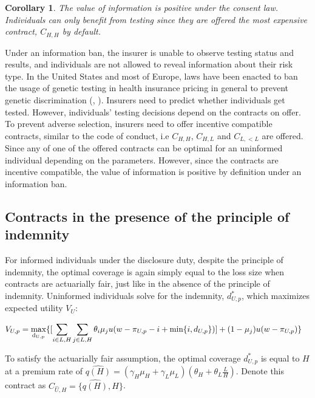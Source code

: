 \documentclass[nonatbib,preprint,12pt]{elsarticle}
\theoremstyle{plain}
\newtheorem{corollary}[theorem]{Corollary}
\theoremstyle{definition}
\theoremstyle{plain}
\theoremstyle{TheoremNum}
\theoremstyle{CorollaryNum}
\theoremstyle{PropositionNum}
\theoremstyle{TheoremNum}
\begin{document}
\setcounter{theorem}{2}
\renewcommand{\thetheorem}{\arabic{theorem}}
\begin{corollary}
    The value of information is positive under the consent law. Individuals can only benefit from testing since they are offered the most expensive contract, $C_{H,H}$ by default.
\end{corollary}

Under an information ban, the insurer is unable to observe testing status and results, and individuals are not allowed to reveal information about their risk type. In the United States and most of Europe, laws have been enacted to ban the usage of genetic testing in health insurance pricing in general to prevent genetic discrimination (\citeauthor{nill2019use}, \citeyear{nill2019use}). Insurers need to predict whether individuals get tested. However, individuals' testing decisions depend on the contracts on offer. To prevent adverse selection, insurers need to offer incentive compatible contracts, similar to the code of conduct, i.e $C_{H,H}$, $C_{H,L}$ and $C_{L,<L}$ are offered. Since any of one of the offered contracts can be optimal for an uninformed individual depending on the parameters. However, since the contracts are incentive compatible, the value of information is positive by definition under an information ban.

\subsection{Contracts in the presence of the principle of indemnity}

For informed individuals under the disclosure duty, despite the principle of indemnity, the optimal coverage is again simply equal to the loss size when contracts are actuarially fair, just like in the absence of the principle of indemnity. Uninformed individuals solve for the indemnity, $d_{U,p}^*$, which maximizes expected utility $V_{U}$:

\begin{align}
V_{U,p} = \underset{\rm d_{U,p}}{\rm max } & \{[\sum_{i \in {L,H}} \sum_{j \in {L,H}} \theta_i \mu_j u(w-\pi_{U,p}-i+\text{min}\{i,d_{U,p}\})] + (1-\mu_j)u(w-\pi_{U,p})\}
\label{uninformed_p_maxproblem_freqsev}
\end{align}

To satisfy the actuarially fair assumption, the optimal coverage $d_{U,p}^*$ is equal to $H$ at a premium rate of $\widehat{q(H)}= (\gamma_H \mu_H + \gamma_L \mu_L)(\theta_H + \theta_L \frac{L}{H})$. Denote this contract as $C_{\widehat{U},H} = \{\widehat{q(H)}, H\}$.
\end{document}
